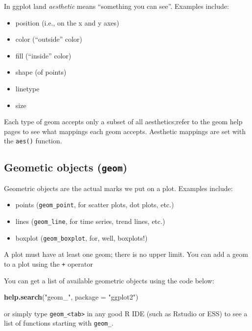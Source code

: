 \documentclass[]{book}
\newenvironment{Shaded}{\begin{snugshade}}{\end{snugshade}}
\newcommand{\KeywordTok}[1]{\textcolor[rgb]{0.13,0.29,0.53}{\textbf{#1}}}
\newcommand{\DataTypeTok}[1]{\textcolor[rgb]{0.13,0.29,0.53}{#1}}
\newcommand{\StringTok}[1]{\textcolor[rgb]{0.31,0.60,0.02}{#1}}
\newcommand{\NormalTok}[1]{#1}
\providecommand{\tightlist}{%
  \setlength{\itemsep}{0pt}\setlength{\parskip}{0pt}}
\begin{document}
In ggplot land \emph{aesthetic} means ``something you can see''.
Examples include:

\begin{itemize}
\tightlist
\item
  position (i.e., on the x and y axes)
\item
  color (``outside'' color)
\item
  fill (``inside'' color)
\item
  shape (of points)
\item
  linetype
\item
  size
\end{itemize}

Each type of geom accepts only a subset of all aesthetics;refer to the
geom help pages to see what mappings each geom accepts. Aesthetic
mappings are set with the \texttt{aes()} function.

\subsection{\texorpdfstring{Geometic objects
(\texttt{geom})}{Geometic objects (geom)}}\label{geometic-objects-geom}

Geometric objects are the actual marks we put on a plot. Examples
include:

\begin{itemize}
\tightlist
\item
  points (\texttt{geom\_point}, for scatter plots, dot plots, etc.)
\item
  lines (\texttt{geom\_line}, for time series, trend lines, etc.)
\item
  boxplot (\texttt{geom\_boxplot}, for, well, boxplots!)
\end{itemize}

A plot must have at least one geom; there is no upper limit. You can add
a geom to a plot using the \texttt{+} operator

You can get a list of available geometric objects using the code below:

\begin{Shaded}
\begin{Highlighting}[]
\KeywordTok{help.search}\NormalTok{(}\StringTok{"geom_"}\NormalTok{, }\DataTypeTok{package =} \StringTok{"ggplot2"}\NormalTok{)}
\end{Highlighting}
\end{Shaded}

or simply type \texttt{geom\_\textless{}tab\textgreater{}} in any good R
IDE (such as Rstudio or ESS) to see a list of functions starting with
\texttt{geom\_}.
\end{document}
